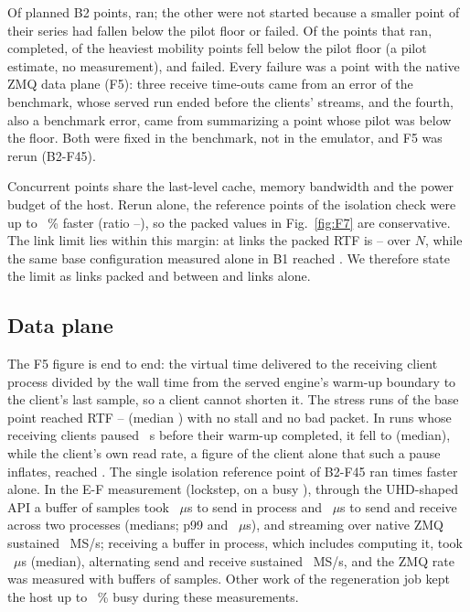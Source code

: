 Of \numBtwoPlanned{} planned B2 points, \numBtwoRun{} ran; the other
\numBtwoPruned{} were not started because a smaller point of their series had fallen below the
pilot floor or failed. Of the points that ran, \numBtwoOk{} completed, \numBtwoBelowFloor{} of
the heaviest mobility points fell below the pilot floor (a pilot estimate, no measurement),
and \numBtwoFailed{} failed. Every failure was a point with the native ZMQ data plane (F5):
three receive time-outs came from an error of the benchmark, whose served run ended before
the clients' streams, and the fourth, also a benchmark error, came from summarizing a point
whose pilot was below the floor. Both were fixed in the benchmark, not in the emulator, and F5 was rerun
(B2-F45).

Concurrent points share the last-level cache, memory bandwidth and the
power budget of the host. Rerun alone, the \numBtwoIsoPoints{} reference points of the
isolation check were up to \numBtwoIsoMaxPct~\% faster (ratio \numBtwoIsoMin--\numBtwoIsoMax),
so the packed values in Fig.~\ref{fig:F7} are conservative. The link limit lies within this
margin: at \numBtwoLsixteen{} links the packed RTF is \numBtwoLsixteenMin--\numBtwoLsixteenMax{}
over $N$, while the same base configuration measured alone in B1 reached \numBoneLsixteenRtf.
We therefore state the limit as \numBtwoMaxLinks{} links packed and between \numBtwoMaxLinks{}
and \numBtwoLsixteen{} links alone.

\subsection{Data plane}
The F5 figure is end to end: the virtual time delivered to the receiving
client process divided by the wall time from the served engine's warm-up boundary to the
client's last sample, so a client cannot shorten it. The \numBtwoFfiveStressRuns{} stress runs
of the base point reached RTF \numBtwoFfiveStressMin--\numBtwoFfiveStressMax{} (median
\numBtwoFfiveStressMed) with no stall and no bad packet. In \numBtwoFfivePauseRuns{} runs whose
receiving clients paused \numBtwoFfivePauseS~s before their warm-up completed, it fell to
\numBtwoFfivePauseRtf{} (median), while the client's own read rate, a figure of the client
alone that such a pause inflates, reached \numBtwoFfivePauseClientRtf. The single isolation reference point of
B2-F45 ran \numBtwoFfiveIsoRatio{} times faster alone. In the E-F measurement (lockstep, on a
busy \txtHostServer{}), through the UHD-shaped API a buffer of \numApiBufferSamples{} samples
took \numApiSendPfiftyUs~$\mu$s to send in process and \numZmqRttPfiftyUs~$\mu$s to send and
receive across two processes (medians; p99 \numApiSendPninetynineUs{} and
\numZmqRttPninetynineUs~$\mu$s), and streaming over native ZMQ sustained
\numApiThroughputMsps~MS/s; receiving a buffer in
process, which includes computing it, took \numApiRecvPfiftyUs~$\mu$s (median), alternating
send and receive sustained \numApiInprocMsps~MS/s, and the ZMQ rate was measured with buffers of
\numApiZmqBufferSamples{} samples. Other work of the regeneration job kept the host up to
\numEfLatencyBusyMaxPct~\% busy during these measurements.

